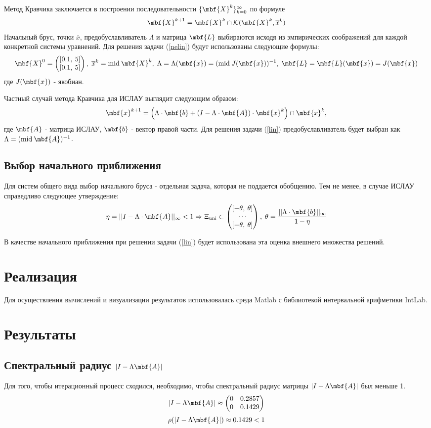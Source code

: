 \documentclass[a4paper]{article}
\begin{document}
Метод Кравчика заключается в построении последовательности $\{\mbf{X}^k\}_{k=0}^\infty$ по формуле 
$$\mbf{X}^{k+1}=\mbf{X}^{k}\cap\mathcal{K}(\mbf{X}^k, \overline{x}^k)$$ Начальный брус, точки $\overline{x}$, предобуславливатель $\Lambda$ и матрица $\mbf{L}$ выбираются исходя из эмпирических соображений для каждой конкретной системы уравнений. Для решения задачи (\ref{nelin}) будут использованы следующие формулы:
$$\mbf{X}^0=\begin{pmatrix}[0.1,\: 5]\\ [0.1,\: 5]\end{pmatrix},\;\overline{x}^k=\mathrm{mid}\:\mbf{X}^k,\;\Lambda=\Lambda(\mbf{x})=(\mathrm{mid}\:J(\mbf{x}))^{-1},\;\mbf{L}=\mbf{L}(\mbf{x})=J(\mbf{x})$$
где $J(\mbf{x})$ - якобиан.

Частный случай метода Кравчика для ИСЛАУ выглядит следующим образом:
$$\mbf{x}^{k+1}=\left(\Lambda\cdot\mbf{b}+(I-\Lambda\cdot\mbf{A})\cdot\mbf{x}^k\right)\cap\mbf{x}^{k},$$
где $\mbf{A}$ - матрица ИСЛАУ, $\mbf{b}$ - вектор правой части. Для решения задачи (\ref{lin}) предобуславливатель будет выбран как $\Lambda=(\mathrm{mid}\:\mbf{A})^{-1}$. 
\subsection{Выбор начального приближения}
Для систем общего вида выбор начального бруса - отдельная задача, которая не поддается обобщению. Тем не менее, в случае ИСЛАУ справедливо следующее утверждение:
$$\eta=||I-\Lambda\cdot\mbf{A}||_\infty<1\Rightarrow\Xi_{\mathrm{uni}}\subset\begin{pmatrix}[-\theta,\:\theta]\\ \cdots\\ [-\theta,\:\theta]\end{pmatrix},\;\theta=\frac{||\Lambda\cdot\mbf{b}||_\infty}{1-\eta}$$

В качестве начального приближения при решении задачи (\ref{lin}) будет использована эта оценка внешнего множества решений.
\section{Реализация}
Для осуществления вычислений и визуализации результатов использовалась среда Matlab с библиотекой интервальной арифметики IntLab.
\section{Результаты}
\subsection{Спектральный радиус $|I-\Lambda\mbf{A}|$}
Для того, чтобы итерационный процесс сходился, необходимо, чтобы спектральный радиус матрицы $|I-\Lambda\mbf{A}|$ был меньше 1.
$$|I-\Lambda\mbf{A}|\approx\begin{pmatrix}0&0.2857\\ 0&0.1429\end{pmatrix}$$
$$\rho(|I-\Lambda\mbf{A}|)\approx0.1429<1$$
\end{document}
